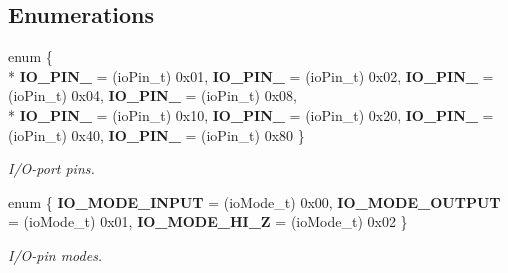 \subsection*{Enumerations}
\begin{DoxyCompactItemize}
\item 
enum \{ \\*
{\bfseries I\+O\+\_\+\+P\+I\+N\+\_} = (io\+Pin\+\_\+t) 0x01, 
{\bfseries I\+O\+\_\+\+P\+I\+N\+\_} = (io\+Pin\+\_\+t) 0x02, 
{\bfseries I\+O\+\_\+\+P\+I\+N\+\_} = (io\+Pin\+\_\+t) 0x04, 
{\bfseries I\+O\+\_\+\+P\+I\+N\+\_} = (io\+Pin\+\_\+t) 0x08, 
\\*
{\bfseries I\+O\+\_\+\+P\+I\+N\+\_} = (io\+Pin\+\_\+t) 0x10, 
{\bfseries I\+O\+\_\+\+P\+I\+N\+\_} = (io\+Pin\+\_\+t) 0x20, 
{\bfseries I\+O\+\_\+\+P\+I\+N\+\_} = (io\+Pin\+\_\+t) 0x40, 
{\bfseries I\+O\+\_\+\+P\+I\+N\+\_} = (io\+Pin\+\_\+t) 0x80
 \}\label{io__ports_8h_a06fc87d81c62e9abb8790b6e5713c55b}
\begin{DoxyCompactList}\small\item\em I/\+O-\/port pins. \end{DoxyCompactList}
\item 
enum \{ {\bfseries I\+O\+\_\+\+M\+O\+D\+E\+\_\+\+I\+N\+P\+UT} = (io\+Mode\+\_\+t) 0x00, 
{\bfseries I\+O\+\_\+\+M\+O\+D\+E\+\_\+\+O\+U\+T\+P\+UT} = (io\+Mode\+\_\+t) 0x01, 
{\bfseries I\+O\+\_\+\+M\+O\+D\+E\+\_\+\+H\+I\+\_\+Z} = (io\+Mode\+\_\+t) 0x02
 \}\label{io__ports_8h_adf764cbdea00d65edcd07bb9953ad2b7}
\begin{DoxyCompactList}\small\item\em I/\+O-\/pin modes. \end{DoxyCompactList}
\end{DoxyCompactItemize}
